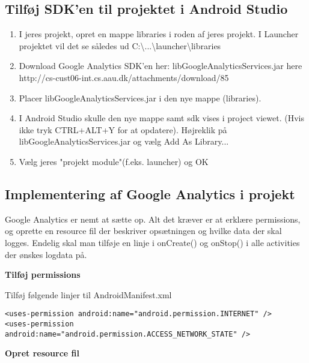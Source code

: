 \subsection{Tilføj SDK'en til projektet i Android Studio}
\begin{enumerate}
	\item I jeres projekt, opret en mappe libraries i roden af jeres projekt.
	I Launcher projektet vil det se således ud C:\textbackslash...\textbackslash launcher\textbackslash libraries
	\item Download Google Analytics SDK'en her: libGoogleAnalyticsServices.jar here http://cs-cust06-int.cs.aau.dk/attachments/download/85
	\item Placer libGoogleAnalyticsServices.jar i den nye mappe (libraries).
	\item I Android Studio skulle den nye mappe samt sdk vises i project viewet. (Hvis ikke tryk CTRL+ALT+Y for at opdatere). Højreklik på libGoogleAnalyticsServices.jar og vælg Add As Library...
	\item Vælg jeres "projekt module"(f.eks. launcher) og OK
\end{enumerate}

\subsection{Implementering af Google Analytics i projekt}
Google Analytics er nemt at sætte op.
Alt det kræver er at erklære permissions, og oprette en resource fil der beskriver opsætningen og hvilke data der skal logges. Endelig skal man tilføje en linje i onCreate() og onStop() i alle activities der ønskes logdata på.

\textbf{Tilføj permissions}

Tilføj følgende linjer til AndroidManifest.xml

\begin{lstlisting}
<uses-permission android:name="android.permission.INTERNET" />
<uses-permission android:name="android.permission.ACCESS_NETWORK_STATE" />
\end{lstlisting}

\textbf{Opret resource fil}

